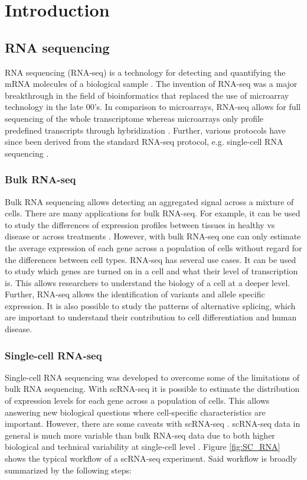 

\chapter{Introduction}

\section{RNA sequencing}
RNA sequencing (RNA-seq) is a technology for detecting and quantifying the mRNA molecules of a biological sample \citep{rna_seq}. The invention of RNA-seq was a major breakthrough in the field of bioinformatics that replaced the use of microarray technology in the late 00's. In comparison to microarrays, RNA-seq allows for full sequencing of the whole transcriptome whereas microarrays only profile predefined transcripts through hybridization \citep{rna_seq_comparison}. Further, various protocols have since been derived from the standard RNA-seq protocol, e.g. single-cell RNA sequencing \citep{rna_seq}.

\subsection{Bulk RNA-seq}
Bulk RNA sequencing allows detecting an aggregated signal across a mixture of cells. There are many applications for bulk RNA-seq. For example, it can be used to study the differences of expression profiles between tissues in healthy vs disease or across treatments \citep{rna_seq}. However, with bulk RNA-seq one can only estimate the average expression of each gene across a population of cells without regard for the differences between cell types. RNA-seq has several use cases. It can be used to study which genes are turned on in a cell and what their level of transcription is. This allows researchers to understand the biology of a cell at a deeper level. Further, RNA-seq allows the identification of variants and allele specific expression. It is also possible to study the patterns of alternative splicing, which are important to understand their contribution to cell differentiation and human disease.

\subsection{Single-cell RNA-seq}
Single-cell RNA sequencing was developed to overcome some of the limitations of bulk RNA sequencing. With scRNA-seq it is possible to estimate the distribution of expression levels for each gene across a population of cells. This allows answering new biological questions where cell-specific characteristics are important. However, there are some caveats with scRNA-seq \citep{scrna_seq}. scRNA-seq data in general is much more variable than bulk RNA-seq data due to both higher biological and technical variability at single-cell level \citep{scrna_seq}. Figure \ref{fig:SC_RNA} shows the typical workflow of a scRNA-seq experiment. Said workflow is broadly summarized by the following steps:

